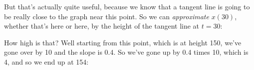 \documentclass[pdftex, brazil, 12pt, twoside]{article}
\begin{document}
\begin{figure}[H]
  \begin{center}
  \end{center}
\end{figure}

But that's actually quite useful,
because we know that a tangent line is
going to be really close to the graph near this point.
So we can \emph{approximate} $x(30)$, whether that's
here or here, by the height of the tangent line at $t
= 30$:

\begin{figure}[H]
  \begin{center}
  \end{center}
\end{figure}

How high is that?
Well starting from this point, which is at height 150,
we've gone over by 10 and the slope is 0.4.
So we've gone up by 0.4 times 10, which
is 4, and so we end up at 154:
\end{document}
